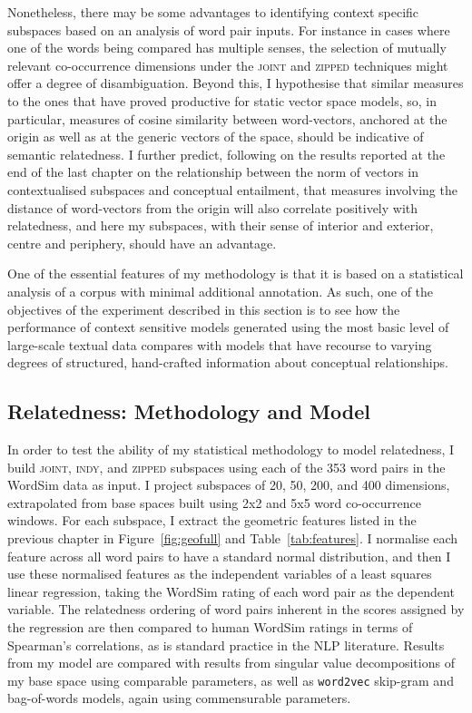Nonetheless, there may be some advantages to identifying context specific subspaces based on an analysis of word pair inputs.  For instance in cases where one of the words being compared has multiple senses, the selection of mutually relevant co-occurrence dimensions under the \textsc{joint} and \textsc{zipped} techniques might offer a degree of disambiguation.  Beyond this, I hypothesise that similar measures to the ones that have proved productive for static vector space models, so, in particular, measures of cosine similarity between word-vectors, anchored at the origin as well as at the generic vectors of the space, should be indicative of semantic relatedness.  I further predict, following on the results reported at the end of the last chapter on the relationship between the norm of vectors in contextualised subspaces and conceptual entailment, that measures involving the distance of word-vectors from the origin will also correlate positively with relatedness, and here my subspaces, with their sense of interior and exterior, centre and periphery, should have an advantage.

One of the essential features of my methodology is that it is based on a statistical analysis of a corpus with minimal additional annotation.  As such, one of the objectives of the experiment described in this section is to see how the performance of context sensitive models generated using the most basic level of large-scale textual data compares with models that have recourse to varying degrees of structured, hand-crafted information about conceptual relationships.

\subsection{Relatedness: Methodology and Model}
In order to test the ability of my statistical methodology to model relatedness, I build \textsc{joint}, \textsc{indy}, and \textsc{zipped} subspaces using each of the 353 word pairs in the WordSim data as input.  I project subspaces of 20, 50, 200, and 400 dimensions, extrapolated from base spaces built using 2x2 and 5x5 word co-occurrence windows.  For each subspace, I extract the geometric features listed in the previous chapter in Figure~\ref{fig:geofull} and Table~\ref{tab:features}.  I normalise each feature across all word pairs to have a standard normal distribution, and then I use these normalised features as the independent variables of a least squares linear regression, taking the WordSim rating of each word pair as the dependent variable.  The relatedness ordering of word pairs inherent in the scores assigned by the regression are then compared to human WordSim ratings in terms of Spearman's correlations, as is standard practice in the NLP literature.  Results from my model are compared with results from singular value decompositions of my base space using comparable parameters, as well as \texttt{word2vec} skip-gram and bag-of-words models, again using commensurable parameters.

